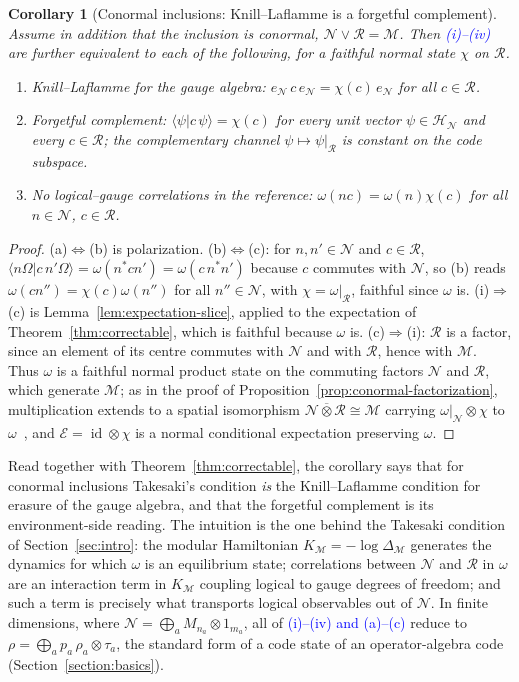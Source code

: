 \documentclass[a4paper,11pt]{article}
\newtheorem{corollary}[theorem]{Corollary}
\theoremstyle{definition}
\newcommand{\mR}{\mathcal{R}}
\newcommand{\mN}{\mathcal{N}}
\newcommand{\mH}{\mathcal{H}}
\newcommand{\mM}{\mathcal{M}}
\newcommand{\NL}[1]{\textcolor{blue}{#1}}
\newcommand{\mE}{\mathcal{E}}
\begin{document}
\begin{corollary}[Conormal inclusions: Knill--Laflamme is a forgetful complement]\label{cor:KL-conormal}
Assume in addition that the inclusion is conormal, $\mN\vee\mR=\mM$. Then \NL{{\rm(i)--(iv)}} are further equivalent to each of the following, for a faithful normal state $\chi$ on $\mR$.
\begin{enumerate}
 \item[\rm(a)] \emph{Knill--Laflamme for the gauge algebra:} $e_{\mN}\,c\,e_{\mN}=\chi(c)\,e_{\mN}$ for all $c\in\mR$.
 \item[\rm(b)] \emph{Forgetful complement:} $\langle\psi|c\,\psi\rangle=\chi(c)$ for every unit vector $\psi\in\mH_{\mN}$ and every $c\in\mR$; the complementary channel $\psi\mapsto\psi|_{\mR}$ is constant on the code subspace.
 \item[\rm(c)] \emph{No logical--gauge correlations in the reference:} $\omega(nc)=\omega(n)\chi(c)$ for all $n\in\mN$, $c\in\mR$.
\end{enumerate}
\end{corollary}

\begin{proof}
(a)$\Leftrightarrow$(b) is polarization. (b)$\Leftrightarrow$(c): for $n,n'\in\mN$ and $c\in\mR$, $\langle n\Omega|c\,n'\Omega\rangle=\omega(n^*cn')=\omega(c\,n^*n')$ because $c$ commutes with $\mN$, so (b) reads $\omega(cn'')=\chi(c)\omega(n'')$ for all $n''\in\mN$, with $\chi=\omega|_{\mR}$, faithful since $\omega$ is. (i)$\Rightarrow$(c) is Lemma~\ref{lem:expectation-slice}, applied to the expectation of Theorem~\ref{thm:correctable}, which is faithful because $\omega$ is. (c)$\Rightarrow$(i): $\mR$ is a factor, since an element of its centre commutes with $\mN$ and with $\mR$, hence with $\mM$. Thus $\omega$ is a faithful normal product state on the commuting factors $\mN$ and $\mR$, which generate $\mM$; as in the proof of Proposition~\ref{prop:conormal-factorization}, multiplication extends to a spatial isomorphism $\mN\overline\otimes\mR\cong\mM$ carrying $\omega|_{\mN}\otimes\chi$ to $\omega$~\cite{DoplicherLongo1984}, and $\mE=\operatorname{id}\otimes\chi$ is a normal conditional expectation preserving $\omega$.
\end{proof}

Read together with Theorem~\ref{thm:correctable}, the corollary says that for conormal inclusions Takesaki's condition \emph{is} the Knill--Laflamme condition for erasure of the gauge algebra, and that the forgetful complement is its environment-side reading. The intuition is the one behind the Takesaki condition of Section~\ref{sec:intro}: the modular Hamiltonian $K_{\mM}=-\log\Delta_{\mM}$ generates the dynamics for which $\omega$ is an equilibrium state; correlations between $\mN$ and $\mR$ in $\omega$ are an interaction term in $K_{\mM}$ coupling logical to gauge degrees of freedom; and such a term is precisely what transports logical observables out of $\mN$. In finite dimensions, where $\mN=\bigoplus_aM_{n_a}\otimes1_{m_a}$, all of \NL{(i)--(iv) and (a)--(c)} reduce to $\rho=\bigoplus_ap_a\,\rho_a\otimes\tau_a$, the standard form of a code state of an operator-algebra code (Section~\ref{section:basics}).
\end{document}
